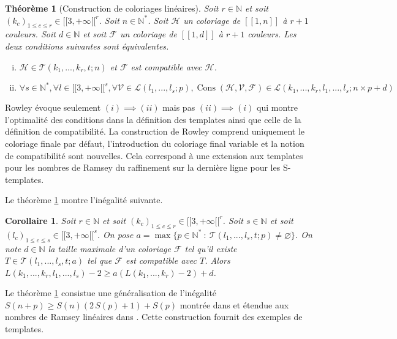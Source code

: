 \documentclass{article}
\newtheorem{theorem}[definition]{Théorème}
\newtheorem{corollary}[definition]{Corollaire}
\DeclareMathOperator{\cons}{Cons}
\begin{document}
\begin{theorem}[Construction de coloriages linéaires]
\label{thm:temp}
Soit \(r \in \mathbb{N}\) et soit \((k_c)_{1 \leqslant c \leqslant r} \in {[\![3, +\infty[\![}^r\). Soit \(n \in \mathbb{N}^*\). Soit \(\mathcal{H}\) un coloriage de \([\![1,n]\!]\) à \(r + 1\) couleurs. Soit \(d \in \mathbb{N}\) et soit \(\mathcal{F}\) un coloriage de \([\![1, d]\!]\) à \(r + 1\) couleurs. Les deux conditions suivantes sont équivalentes.

\begin{enumerate}[(i)]
\item \(\mathcal{H} \in \mathcal{T}(k_1, ..., k_r, t; n)\) et \(\mathcal{F}\) est compatible  avec \(\mathcal{H}\).
\item \(\forall s \in \mathbb{N}^*, \forall l \in {[\![3, +\infty[\![}^s, \forall \mathcal{V} \in \mathcal{L}(l_1, ..., l_s ; p), \cons(\mathcal{H}, \mathcal{V}, \mathcal{F}) \in  \mathcal{L}(k_1, ..., k_r, l_1, ..., l_s ; n \times p + d)\)
\end{enumerate}
\end{theorem}

Rowley évoque seulement \((i) \implies (ii)\) mais pas \((ii) \implies (i)\) qui montre l'optimalité des conditions dans la définition des templates ainsi que celle de la définition de compatibilité.
La construction de Rowley comprend uniquement le coloriage finale par défaut, l'introduction du coloriage final variable et la notion de compatibilité sont nouvelles. Cela correspond à une extension aux templates pour les nombres de Ramsey du raffinement sur la dernière ligne pour les S-templates.

Le théorème \ref{thm:temp} montre l'inégalité suivante.

\begin{corollary}
Soit \(r \in \mathbb{N}\) et soit \((k_c)_{1 \leqslant c \leqslant r} \in {[\![3, +\infty[\![}^r\). Soit \(s \in \mathbb{N}\) et soit \((l_c)_{1 \leqslant c \leqslant s} \in {[\![3, +\infty[\![}^s\). On pose \(a =\max \{p \in \mathbb{N}^* ~:~ \mathcal{T}(l_1, ..., l_s, t; p) \neq \varnothing\}\). On note \(d \in \mathbb{N}\) la taille maximale d'un coloriage \(\mathcal{F}\) tel qu'il existe\(T \in \mathcal{T}(l_1, ..., l_s, t; a)\) tel que \(\mathcal{F}\) est compatible avec \(T\). Alors \(L(k_1, ..., k_r, l_1, ..., l_s) - 2 \geqslant a (L(k_1, ..., k_r) - 2) + d\).
\end{corollary}

Le théorème \ref{thm:temp} consistue une généralisation de l'inégalité \(S(n + p) \geqslant S(n)  (2 \, S(p) + 1) + S(p)\) montrée dans \cite{AbbottHanson} et étendue aux nombres de Ramsey linéaires dans \cite{rowleyramseyabott}. Cette construction fournit des exemples de templates.
\end{document}
